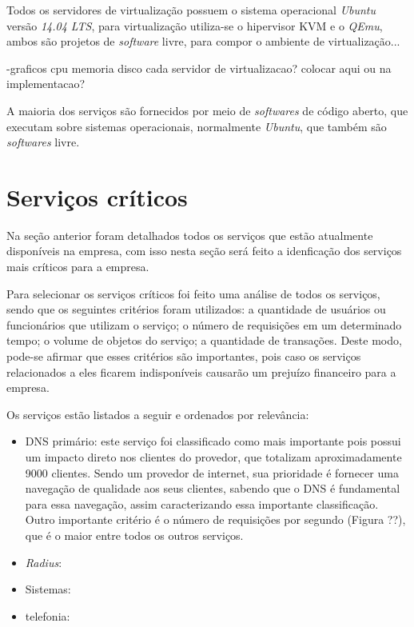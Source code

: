 Todos os servidores de virtualização possuem o sistema operacional \textit{Ubuntu} versão \textit{14.04 LTS}, para virtualização utiliza-se o 
hipervisor \ac{KVM} e o \textit{QEmu}, ambos são projetos de \textit{software} livre, para compor o ambiente de virtualização...

-graficos cpu memoria disco cada servidor de virtualizacao? colocar aqui ou na implementacao?

A maioria dos serviços são fornecidos por meio de \textit{softwares} de código aberto, que executam sobre sistemas operacionais, normalmente 
\textit{Ubuntu}, que também são \textit{softwares} livre.

\section{Serviços críticos}
\label{section:servcrit}

Na seção anterior foram detalhados todos os serviços que estão atualmente disponíveis na empresa, com isso nesta seção será feito a idenficação
dos serviços mais críticos para a empresa.

Para selecionar os serviços críticos foi feito uma análise de todos os serviços, sendo que os seguintes critérios foram utilizados: 
a quantidade de usuários ou funcionários que utilizam o serviço; 
o número de requisições em um determinado tempo;
o volume de objetos do serviço;
a quantidade de transações.
Deste modo, pode-se afirmar que esses critérios são importantes, pois caso os serviços relacionados a eles ficarem indisponíveis causarão 
um prejuízo financeiro para a empresa. 

Os serviços estão listados a seguir e ordenados por relevância:
\begin{itemize}
 \item \ac{DNS} primário: este serviço foi classificado como mais importante pois possui um impacto direto nos clientes do provedor, que 
 totalizam aproximadamente 9000 clientes. Sendo um provedor de internet, sua prioridade é fornecer uma navegação de qualidade aos seus clientes, 
 sabendo que o \ac{DNS} é fundamental para essa navegação, assim caracterizando essa importante classificação. Outro importante critério é
 o número de requisições por segundo (Figura ??), que é o maior entre todos os outros serviços.
 \item \textit{Radius}: 
 \item Sistemas: 
 \item telefonia: 
\end{itemize}

